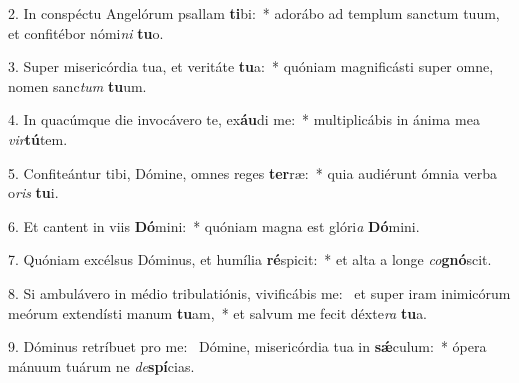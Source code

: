 2. In conspéctu Angelórum psallam \textbf{ti}bi:~*  adorábo ad templum sanctum tuum, et confitébor nómi\textit{ni} \textbf{tu}o.\

3. Super misericórdia tua, et veritáte \textbf{tu}a:~*  quóniam magnificásti super omne, nomen sanc\textit{tum} \textbf{tu}um.\

4. In quacúmque die invocávero te, ex\textbf{áu}di me:~*  multiplicábis in ánima mea \textit{vir}\textbf{tú}tem.\

5. Confiteántur tibi, Dómine, omnes reges \textbf{ter}ræ:~*  quia audiérunt ómnia verba o\textit{ris} \textbf{tu}i.\

6. Et cantent in viis \textbf{Dó}mini:~*  quóniam magna est glóri\textit{a} \textbf{Dó}mini.\

7. Quóniam excélsus Dóminus, et humília \textbf{ré}spicit:~*  et alta a longe \textit{co}\textbf{gnó}scit.\

8. Si ambulávero in médio tribulatiónis, vivificábis me: \dag\  et super iram inimicórum meórum extendísti manum \textbf{tu}am,~*  et salvum me fecit déxte\textit{ra} \textbf{tu}a.\

9. Dóminus retríbuet pro me: \dag\  Dómine, misericórdia tua in \textbf{sǽ}culum:~*  ópera mánuum tuárum ne \textit{de}\textbf{spí}cias.\

